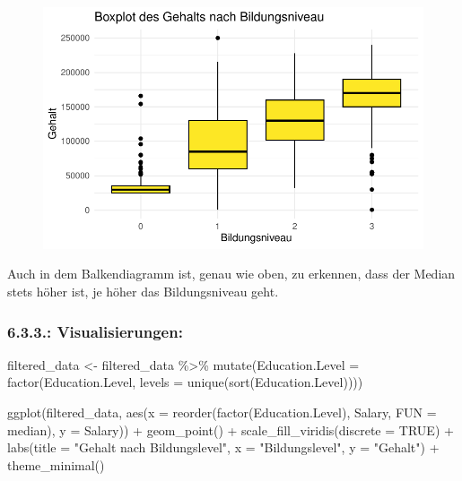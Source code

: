 \documentclass[
  letterpaper,
  DIV=11,
  numbers=noendperiod]{scrartcl}
\newenvironment{Shaded}{\begin{snugshade}}{\end{snugshade}}
\newcommand{\AttributeTok}[1]{\textcolor[rgb]{0.40,0.45,0.13}{#1}}
\newcommand{\ConstantTok}[1]{\textcolor[rgb]{0.56,0.35,0.01}{#1}}
\newcommand{\FunctionTok}[1]{\textcolor[rgb]{0.28,0.35,0.67}{#1}}
\newcommand{\NormalTok}[1]{\textcolor[rgb]{0.00,0.23,0.31}{#1}}
\newcommand{\OtherTok}[1]{\textcolor[rgb]{0.00,0.23,0.31}{#1}}
\newcommand{\SpecialCharTok}[1]{\textcolor[rgb]{0.37,0.37,0.37}{#1}}
\newcommand{\StringTok}[1]{\textcolor[rgb]{0.13,0.47,0.30}{#1}}
\begin{document}
\begin{figure}[H]

{\centering \includegraphics{main_doc_files/figure-pdf/unnamed-chunk-78-1.pdf}

}

\end{figure}

Auch in dem Balkendiagramm ist, genau wie oben, zu erkennen, dass der
Median stets höher ist, je höher das Bildungsniveau geht.

\hypertarget{visualisierungen}{%
\subsubsection{\texorpdfstring{6.3.3.:
\textbf{Visualisierungen:}}{6.3.3.: Visualisierungen:}}\label{visualisierungen}}

\begin{Shaded}
\begin{Highlighting}[]
\NormalTok{filtered\_data }\OtherTok{\textless{}{-}}\NormalTok{ filtered\_data }\SpecialCharTok{\%\textgreater{}\%}
  \FunctionTok{mutate}\NormalTok{(}\AttributeTok{Education.Level =} \FunctionTok{factor}\NormalTok{(Education.Level, }\AttributeTok{levels =} \FunctionTok{unique}\NormalTok{(}\FunctionTok{sort}\NormalTok{(Education.Level))))}

\FunctionTok{ggplot}\NormalTok{(filtered\_data, }\FunctionTok{aes}\NormalTok{(}\AttributeTok{x =} \FunctionTok{reorder}\NormalTok{(}\FunctionTok{factor}\NormalTok{(Education.Level), Salary, }\AttributeTok{FUN =}\NormalTok{ median), }\AttributeTok{y =}\NormalTok{ Salary)) }\SpecialCharTok{+}
  \FunctionTok{geom\_point}\NormalTok{() }\SpecialCharTok{+} 
  \FunctionTok{scale\_fill\_viridis}\NormalTok{(}\AttributeTok{discrete =} \ConstantTok{TRUE}\NormalTok{) }\SpecialCharTok{+}
  \FunctionTok{labs}\NormalTok{(}\AttributeTok{title =} \StringTok{"Gehalt nach Bildungslevel"}\NormalTok{,}
       \AttributeTok{x =} \StringTok{"Bildungslevel"}\NormalTok{,}
       \AttributeTok{y =} \StringTok{"Gehalt"}\NormalTok{) }\SpecialCharTok{+}
  \FunctionTok{theme\_minimal}\NormalTok{()}
\end{Highlighting}
\end{Shaded}
\end{document}
